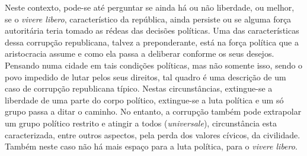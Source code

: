 Neste contexto, pode-se até perguntar se ainda há ou não liberdade, ou
melhor, se o \emph{vivere libero}, característico da república, ainda
persiste ou se alguma força autoritária teria tomado as rédeas das
decisões políticas. Uma das características dessa corrupção republicana,
talvez a preponderante, está na força política que a aristocracia assume
e como ela passa a deliberar conforme os seus desejos. Pensando numa
cidade em tais condições políticas, mas não somente isso, sendo o povo
impedido de lutar pelos seus direitos, tal quadro é uma descrição de um
caso de corrupção republicana típico. Nestas circunstâncias, extingue-se
a liberdade de uma parte do corpo político, extingue-se a luta política
e um só grupo passa a ditar o caminho. No entanto, a corrupção também
pode extrapolar um grupo político restrito e atingir a todos
(\emph{universale}), circunstância esta caracterizada, entre outros
aspectos, pela perda dos valores cívicos, da civilidade. Também neste
caso não há mais espaço para a luta política, para o \emph{vivere
libero}.


